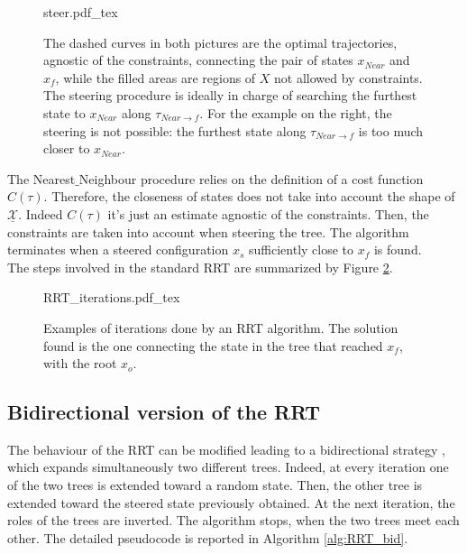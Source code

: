  \begin{figure}
	 \centering
 \def\svgwidth{0.45 \columnwidth}
 {steer.pdf_tex} 
	 \caption{The dashed curves in both pictures are the optimal trajectories, agnostic of the constraints, connecting the pair of states $x_{Near}$ and $x_f$, while the filled areas are regions of $X$ not allowed by constraints.
 The steering procedure is ideally in charge of searching the furthest state to $x_{Near}$ along $\tau_{ Near \rightarrow f}$. For the example on the right, the steering is not possible: the furthest state along $\tau_{ Near \rightarrow f}$ is too much closer to $x_{Near}$.}
 \label{fig:Steer}
 \end{figure}


The Nearest$\_$Neighbour procedure relies on the definition of a cost function $C(\tau)$. Therefore, the closeness of states does not take into account the shape of $\underline{\mathcal{X}}$. Indeed $C(\tau)$ it's just an estimate agnostic of the constraints. Then, the constraints are taken into account when steering the tree.
The algorithm terminates when a steered configuration $x_s$ sufficiently close to $x_f$ is found.     
\\
The steps involved in the standard RRT are summarized by Figure \ref{fig:RRT_single}.

 \begin{figure}
	 \centering
 \def\svgwidth{0.85 \columnwidth}
 {RRT_iterations.pdf_tex} 
	 \caption{Examples of iterations done by an RRT algorithm. The solution found is the one connecting the state in the tree that reached $x_f$, with the root $x_o$.}
 \label{fig:RRT_single}
 \end{figure}


\subsection{Bidirectional version of the RRT}
\label{sec:RRT_bidir}

The behaviour of the RRT can be modified leading to a bidirectional strategy \cite{RRT_bid}, which expands simultaneously two different trees. Indeed, at every iteration one of the two trees is extended toward a random state. Then, the other tree is extended toward the steered state previously obtained. At the next iteration, the roles of the trees are inverted. The algorithm stops, when the two trees meet each other. The detailed pseudocode is reported in Algorithm \ref{alg:RRT_bid}.

